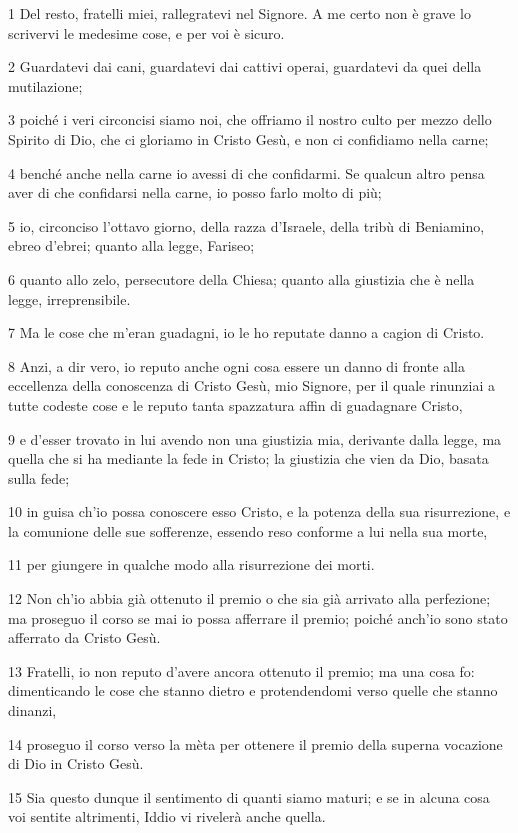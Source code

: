 \par 1 Del resto, fratelli miei, rallegratevi nel Signore. A me certo non è grave lo scrivervi le medesime cose, e per voi è sicuro.
\par 2 Guardatevi dai cani, guardatevi dai cattivi operai, guardatevi da quei della mutilazione;
\par 3 poiché i veri circoncisi siamo noi, che offriamo il nostro culto per mezzo dello Spirito di Dio, che ci gloriamo in Cristo Gesù, e non ci confidiamo nella carne;
\par 4 benché anche nella carne io avessi di che confidarmi. Se qualcun altro pensa aver di che confidarsi nella carne, io posso farlo molto di più;
\par 5 io, circonciso l'ottavo giorno, della razza d'Israele, della tribù di Beniamino, ebreo d'ebrei; quanto alla legge, Fariseo;
\par 6 quanto allo zelo, persecutore della Chiesa; quanto alla giustizia che è nella legge, irreprensibile.
\par 7 Ma le cose che m'eran guadagni, io le ho reputate danno a cagion di Cristo.
\par 8 Anzi, a dir vero, io reputo anche ogni cosa essere un danno di fronte alla eccellenza della conoscenza di Cristo Gesù, mio Signore, per il quale rinunziai a tutte codeste cose e le reputo tanta spazzatura affin di guadagnare Cristo,
\par 9 e d'esser trovato in lui avendo non una giustizia mia, derivante dalla legge, ma quella che si ha mediante la fede in Cristo; la giustizia che vien da Dio, basata sulla fede;
\par 10 in guisa ch'io possa conoscere esso Cristo, e la potenza della sua risurrezione, e la comunione delle sue sofferenze, essendo reso conforme a lui nella sua morte,
\par 11 per giungere in qualche modo alla risurrezione dei morti.
\par 12 Non ch'io abbia già ottenuto il premio o che sia già arrivato alla perfezione; ma proseguo il corso se mai io possa afferrare il premio; poiché anch'io sono stato afferrato da Cristo Gesù.
\par 13 Fratelli, io non reputo d'avere ancora ottenuto il premio; ma una cosa fo: dimenticando le cose che stanno dietro e protendendomi verso quelle che stanno dinanzi,
\par 14 proseguo il corso verso la mèta per ottenere il premio della superna vocazione di Dio in Cristo Gesù.
\par 15 Sia questo dunque il sentimento di quanti siamo maturi; e se in alcuna cosa voi sentite altrimenti, Iddio vi rivelerà anche quella.
